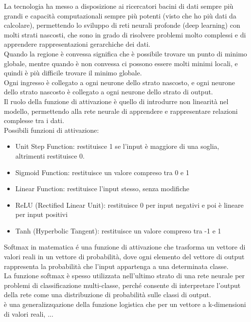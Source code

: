 La tecnologia ha messo a disposizione ai ricercatori bacini di dati sempre più grandi e capacità computazionali sempre più potenti 
(visto che ho più dati da calcolare), permettendo lo sviluppo di reti neurali profonde (deep learning) con molti strati nascosti, 
che sono in grado di risolvere problemi molto complessi e di apprendere rappresentazioni gerarchiche dei dati.\\

Quando la regione è convessa significa che è possibile trovare un punto di minimo globale, mentre quando è non convessa ci possono essere molti minimi locali,
e quindi è più difficile trovare il minimo globale.\\
Ogni ingresso è collegato a ogni neurone dello strato nascosto, e ogni neurone dello strato nascosto è collegato a ogni neurone dello strato di output.\\

Il ruolo della funzione di attivazione è quello di introdurre non linearità nel modello, permettendo alla rete neurale di 
apprendere e rappresentare relazioni complesse tra i dati.\\

Possibili funzioni di attivazione: 
\begin{itemize}
    \item Unit Step Function: restituisce 1 se l'input è maggiore di una soglia, altrimenti restituisce 0.
    \item Sigmoid Function: restituisce un valore compreso tra 0 e 1
    \item Linear Function: restituisce l'input stesso, senza modifiche
    \item ReLU (Rectified Linear Unit): restituisce 0 per input negativi e poi è lineare per input positivi
    \item Tanh (Hyperbolic Tangent): restituisce un valore compreso tra -1 e 1
\end{itemize}

Softmax in matematica é una funzione di attivazione che trasforma un vettore di valori reali in un vettore di probabilità,
dove ogni elemento del vettore di output rappresenta la probabilità che l'input appartenga a una determinata classe.\\
La funzione softmax è spesso utilizzata nell'ultimo strato di una rete neurale per problemi di classificazione multi-classe,
perché consente di interpretare l'output della rete come una distribuzione di probabilità sulle classi di output.\\
è una generalizzqazione della funzione logistica che per un vettore a k-dimensioni di valori reali, 
...

